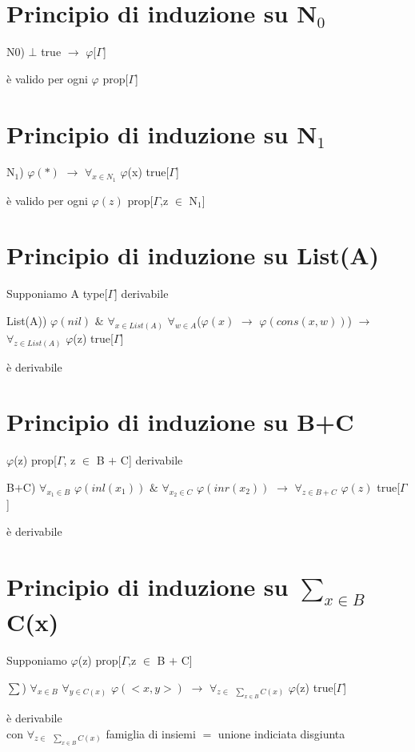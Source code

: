 \section{Principio di induzione su N$_0$}
\label{sec:principio-di-induzione-N0}
\begin{center}N$0$) $\bot$ true $\rightarrow$ $\varphi$[$\Gamma$]\end{center} \`e valido per ogni $\varphi$ prop[$\Gamma$]
\section{Principio di induzione su N$_1$}
\label{sec:principio-di-induzione-N1}
\begin{center}N$_1$) $\varphi(\ast)$ $\rightarrow$ $\forall_{x \in N_1}$ $\varphi$(x) true[$\Gamma$] \end{center}\`e valido per ogni $\varphi(z)$ prop[$\Gamma$,z $\in$ N$_1$]

\section{Principio di induzione su List(A)}
\label{sec:principio-di-induzione-List(A)}
Supponiamo A type[$\Gamma$] derivabile \\
\begin{center}List(A)) $\varphi(nil)$ $\&$ $\forall_{x \in List(A)}$ $\forall_{w \in A}$($\varphi(x)$ $\rightarrow$ $\varphi(cons(x,w))$) $\rightarrow$ $\forall_{z \in List(A)}$ $\varphi$(z) true[$\Gamma$]\end{center} \`e derivabile\\

\section{Principio di induzione su B+C}
\label{sec:principio-di-induzione-B+C}
$\varphi$(z) prop[$\Gamma$, z $\in$ B $+$ C] derivabile
\noindent
\begin{center}B$+$C) $\forall_{x_1 \in B}$  $\varphi(inl(x_1))$ $\&$ $\forall_{x_2 \in C}$  $\varphi(inr(x_2))$ $\rightarrow$ $\forall_{z\in B+C}$  $\varphi(z)$ true[$\Gamma$]\end{center} \`e derivabile
\section{Principio di induzione su $\sum\limits_{x \in B}$ C(x)}
\label{sec:principio-di-induzione-sum}
Supponiamo $\varphi$(z) prop[$\Gamma$,z $\in$ B $+$ C]
\begin{center}{\scriptsize $\sum$}) $\forall_{x \in B}$ $\forall_{y \in C(x)}$ $\varphi(<x,y>)$ $\rightarrow$ $\forall_{z \in}$ {\scriptsize$_{\sum_{x \in B} C(x)}$} $\varphi$(z) true[$\Gamma$]\end{center} \`e derivabile\\
con $\forall_{z \in}$ {\scriptsize$_{\sum_{x \in B} C(x)}$} famiglia di insiemi $=$ unione indiciata disgiunta\\

